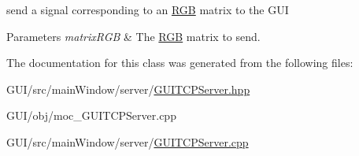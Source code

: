 send a signal corresponding to an \mbox{\hyperlink{class_r_g_b}{R\+GB}} matrix to the G\+UI 


\begin{DoxyParams}{Parameters}
{\em matrix\+R\+GB} & The \mbox{\hyperlink{class_r_g_b}{R\+GB}} matrix to send. \\
\hline
\end{DoxyParams}


The documentation for this class was generated from the following files\+:\begin{DoxyCompactItemize}
\item 
G\+U\+I/src/main\+Window/server/\mbox{\hyperlink{_g_u_i_t_c_p_server_8hpp}{G\+U\+I\+T\+C\+P\+Server.\+hpp}}\item 
G\+U\+I/obj/moc\+\_\+\+G\+U\+I\+T\+C\+P\+Server.\+cpp\item 
G\+U\+I/src/main\+Window/server/\mbox{\hyperlink{_g_u_i_t_c_p_server_8cpp}{G\+U\+I\+T\+C\+P\+Server.\+cpp}}\end{DoxyCompactItemize}

